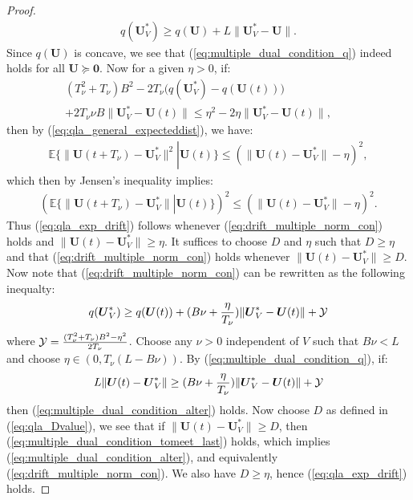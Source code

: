 \documentclass[journal]{IEEEtran}
\newcommand{\expect}[1]{\mathbb{E}\big\{#1\big\}}
\newcommand{\bv}[1]{{\boldsymbol{#1} }}
\newcommand{\script}[1]{{{\cal{#1} }}}
\begin{document}
\begin{proof}
\begin{eqnarray}
q(\bv{U}^*_V)\geq q(\bv{U})+L\|\bv{U}^*_V-\bv{U}\|.\label{eq:multiple_dual_condition_q}
\end{eqnarray}
Since $q(\bv{U})$ is concave, we see that (\ref{eq:multiple_dual_condition_q}) indeed holds for all $\bv{U}\succeq\bv{0}$. Now for a given $\eta>0$, if: 
 \begin{eqnarray}
(T^2_{\nu}+T_{\nu})B^2-2T_{\nu}\big(q(\bv{U}^*_V)-q(\bv{U}(t))\big)\label{eq:drift_multiple_norm_con}\qquad\qquad\qquad\\
+2T_{\nu}\nu B\|\bv{U}^*_V-\bv{U}(t)\|\leq\eta^2-2\eta\|\bv{U}^*_V-\bv{U}(t)\|,\nonumber
\end{eqnarray}
then by  (\ref{eq:qla_general_expecteddist}), we have:
\begin{eqnarray*}
\expect{\|\bv{U}(t+T_{\nu})-\bv{U}_V^*\|^2\left|\right. \bv{U}(t)}\leq (\|\bv{U}(t)-\bv{U}_V^*\|-\eta)^2,
\end{eqnarray*}
which then by Jensen's inequality implies:
\begin{eqnarray*}
(\expect{\|\bv{U}(t+T_{\nu})-\bv{U}^*_V\| \left|\right. \bv{U}(t)})^2
\leq(\|\bv{U}(t)-\bv{U}^*_V\| -\eta)^2.
\end{eqnarray*}
Thus (\ref{eq:qla_exp_drift}) follows whenever (\ref{eq:drift_multiple_norm_con}) holds and $\|\bv{U}(t)-\bv{U}_V^*\|\geq\eta$. It suffices to choose $D$ and $\eta$ such that $D\geq\eta$ and that (\ref{eq:drift_multiple_norm_con}) holds whenever $\|\bv{U}(t)-\bv{U}_V^*\|\geq D$. Now note that (\ref{eq:drift_multiple_norm_con}) can be rewritten as the following inequalty:
\begin{eqnarray}
q(\bv{U}^*_V)\geq q(\bv{U}(t))+(B\nu+\frac{\eta}{T_{\nu}})\|\bv{U}^*_V-\bv{U}(t)\|+\script{Y}\label{eq:multiple_dual_condition_alter}
\end{eqnarray}
where $\script{Y}=\frac{(T^2_{\nu}+T_{\nu})B^2-\eta^2}{2T_{\nu}}$. Choose any $\nu>0$ independent of $V$ such that $B\nu<L$ and choose $\eta\in(0, T_{\nu}(L-B\nu))$. By (\ref{eq:multiple_dual_condition_q}), if:
\begin{eqnarray}
L\|\bv{U}(t)-\bv{U}_V^*\|\geq (B\nu+\frac{\eta}{T_{\nu}})\|\bv{U}^*_V-\bv{U}(t)\|+\script{Y}\label{eq:multiple_dual_condition_tomeet_last}
\end{eqnarray}
then (\ref{eq:multiple_dual_condition_alter}) holds. Now choose $D$ as defined in (\ref{eq:qla_Dvalue}), we see that if $\|\bv{U}(t)-\bv{U}_V^*\|\geq D$, then (\ref{eq:multiple_dual_condition_tomeet_last}) holds, which implies  (\ref{eq:multiple_dual_condition_alter}), and equivalently (\ref{eq:drift_multiple_norm_con}). We also have $D\geq\eta$, hence (\ref{eq:qla_exp_drift}) holds.


\end{proof}
\end{document}
